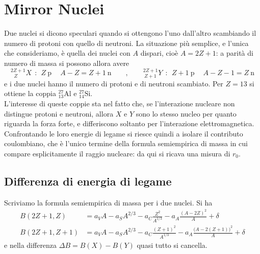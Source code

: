 \chapter{Mirror Nuclei}

Due nuclei si dicono speculari quando si ottengono l'uno dall'altro scambiando il numero di protoni con quello di neutroni. La situazione più semplice, e l'unica che consideriamo, è quella dei nuclei con $A$ dispari, cioè $A = 2Z+1$: a parità di numero di massa si possono allora avere
%
\begin{equation*}
    ^{2Z+1}_{\ \ \ Z}X \ \ : \ \ Z \ \text{p} \quad \ A - Z = Z+1 \ \text{n} \qquad , \qquad ^{2Z+1}_{\ Z+1}Y \ \ : \ \ Z+1 \ \text{p} \quad \ A - Z - 1 = Z \ \text{n}
\end{equation*}
e i due nuclei hanno il numero di protoni e di neutroni scambiato. Per $Z = 13$ si ottiene la coppia $^{27}_{13}\text{Al}$ e $^{27}_{14}\text{Si}$.\\

L'interesse di queste coppie sta nel fatto che, se l'interazione nucleare non distingue protoni e neutroni, allora $X$ e $Y$ sono lo stesso nucleo per quanto riguarda la forza forte, e differiscono soltanto per l'interazione elettromagnetica. Confrontando le loro energie di legame si riesce quindi a isolare il contributo coulombiano, che è l'unico termine della formula semiempirica di massa in cui compare esplicitamente il raggio nucleare: da qui si ricava una misura di $r_0$.

\section{Differenza di energia di legame}

Scriviamo la formula semiempirica di massa per i due nuclei. Si ha
%
\begin{equation*}
\begin{aligned}
    B(2Z+1, Z) &= a_V A - a_S A^{2/3} - a_C \frac{Z^2}{A^{1/3}} - a_A \frac{(A-2Z)^2}{A} + \delta \\[6pt]
    B(2Z+1, Z+1) &= a_V A - a_S A^{2/3} - a_C \frac{(Z+1)^2}{A^{1/3}} - a_A \frac{\big(A-2(Z+1)\big)^2}{A} + \delta
\end{aligned}
\end{equation*}
e nella differenza $\Delta B = B(X) - B(Y)$ quasi tutto si cancella.\\

